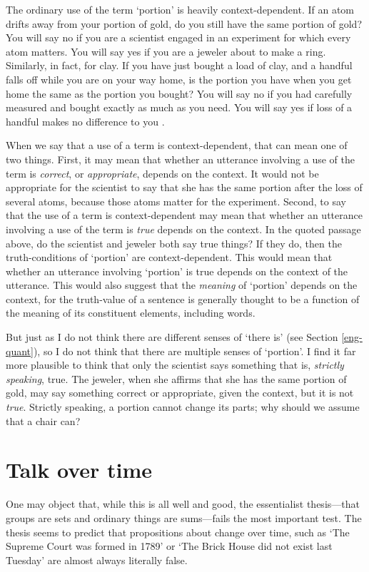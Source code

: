 \documentclass[11pt]{article}
\newenvironment{squote}{%
\begin{spacing}{1}
\begin{list}{}{%
\setlength{\labelwidth}{0pt}%
\rightmargin\leftmargin%
}
\item\relax
}{%
\end{list}%
\end{spacing}
}
\begin{document}
\begin{spacing}{1.5}
\begin{squote}
The ordinary use of the term `portion' is heavily context-dependent.
If an atom drifts away from your portion of gold, do you still have
the same portion of gold?  You will say no if you are a scientist
engaged in an experiment for which every atom matters. You will say
yes if you are a jeweler about to make a ring.  Similarly, in fact,
for clay.  If you have just bought a load of clay, and a handful falls
off while you are on your way home, is the portion you have when you
get home the same as the portion you bought?  You will say no if you
had carefully measured and bought exactly as much as you need.  You
will say yes if loss of a handful makes no difference to you
\citeyearpar[163]{thomson1998a}.
\end{squote}

When we say that a use of a term is context-dependent, that can mean
one of two things.  First, it may mean that whether an utterance
involving a use of the term is {\em correct}, or {\em appropriate},
depends on the context.  It would not be appropriate for the scientist
to say that she has the same portion after the loss of several atoms,
because those atoms matter for the experiment.  Second, to say that
the use of a term is context-dependent may mean that whether an
utterance involving a use of the term is {\em true} depends on the
context.  In the quoted passage above, do the scientist and jeweler
both say true things?  If they do, then the truth-conditions of
`portion' are context-dependent.  This would mean that whether an
utterance involving `portion' is true depends on the context of the
utterance.  This would also suggest that the {\em meaning} of
`portion' depends on the context, for the truth-value of a sentence is
generally thought to be a function of the meaning of its constituent
elements, including words.

But just as I do not think there are different senses of `there is'
(see Section \ref{eng-quant}), so I do not think that there are
multiple senses of `portion'.  I find it far more plausible to think
that only the scientist says something that is, {\em strictly
  speaking}, true.  The jeweler, when she affirms that she has the
same portion of gold, may say something correct or appropriate, given
the context, but it is not {\em true}.  Strictly speaking, a portion
cannot change its parts; why should we assume that a chair can?

\section{Talk over time}
\label{time-talk}
One may object that, while this is all well and good, the essentialist
thesis---that groups are sets and ordinary things are sums---fails the
most important test.  The thesis seems to predict that propositions
about change over time, such as `The Supreme Court was formed in 1789'
or `The Brick House did not exist last Tuesday' are almost always
literally false.


\end{spacing}
\end{document}
